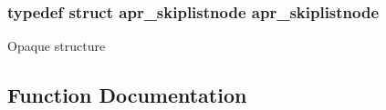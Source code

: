 \subsubsection[{\texorpdfstring{apr\+\_\+skiplistnode}{apr_skiplistnode}}]{\setlength{\rightskip}{0pt plus 5cm}typedef struct {\bf apr\+\_\+skiplistnode} {\bf apr\+\_\+skiplistnode}}\hypertarget{group__apr__skiplist_gafb934f577d03de823aa4d62b41399bc0}{}\label{group__apr__skiplist_gafb934f577d03de823aa4d62b41399bc0}
Opaque structure 

\subsection{Function Documentation}
